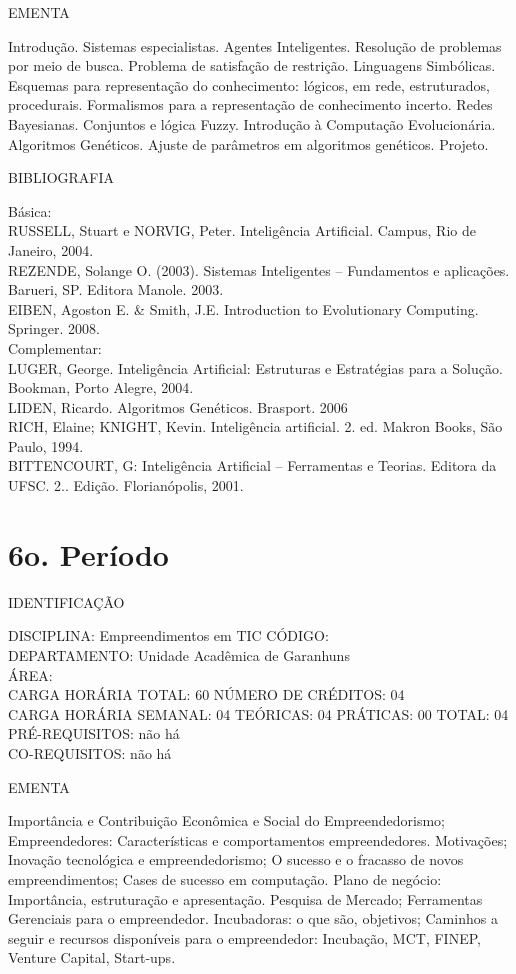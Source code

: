 \documentclass[
	12pt,				%
	openright,			%
  oneside,     %
	a4paper,			%
	chapter=TITLE,		%
	english,			%
	french,				%
	spanish,			%
	brazil				%
	]{abntex2}
\begin{document}
\begin{apendicesenv}
EMENTA 

Introdução. Sistemas especialistas. Agentes Inteligentes. Resolução de
problemas por meio de busca. Problema de satisfação de restrição.
Linguagens Simbólicas. Esquemas para representação do conhecimento:
lógicos, em rede, estruturados, procedurais. Formalismos para a
representação de conhecimento incerto. Redes Bayesianas. Conjuntos e
lógica Fuzzy. Introdução à Computação Evolucionária. Algoritmos
Genéticos. Ajuste de parâmetros em algoritmos genéticos. Projeto.

BIBLIOGRAFIA 

Básica:\\
RUSSELL, Stuart e NORVIG, Peter. Inteligência Artificial. Campus, Rio de
Janeiro, 2004.\\
REZENDE, Solange O. (2003). Sistemas Inteligentes -- Fundamentos e
aplicações. Barueri, SP. Editora Manole. 2003.\\
EIBEN, Agoston E. \& Smith, J.E. Introduction to Evolutionary Computing.
Springer. 2008.\\
Complementar:\\
LUGER, George. Inteligência Artificial: Estruturas e Estratégias para a
Solução. Bookman, Porto Alegre, 2004.\\
LIDEN, Ricardo. Algoritmos Genéticos. Brasport. 2006\\
RICH, Elaine; KNIGHT, Kevin. Inteligência artificial. 2. ed. Makron
Books, São Paulo, 1994.\\
BITTENCOURT, G: Inteligência Artificial -- Ferramentas e Teorias.
Editora da UFSC. 2.. Edição. Florianópolis, 2001.
\newpage 

\section*{6o. Período}

IDENTIFICAÇÃO

DISCIPLINA: Empreendimentos em TIC CÓDIGO:\\ 
DEPARTAMENTO: Unidade Acadêmica de Garanhuns\\
ÁREA:\\
CARGA HORÁRIA TOTAL: 60 NÚMERO DE CRÉDITOS: 04\\
CARGA HORÁRIA SEMANAL: 04 TEÓRICAS: 04 PRÁTICAS: 00 TOTAL: 04\\
PRÉ-REQUISITOS: não há\\
CO-REQUISITOS: não há

EMENTA 

Importância e Contribuição Econômica e Social do Empreendedorismo;
Empreendedores: Características e comportamentos empreendedores.
Motivações; Inovação tecnológica e empreendedorismo; O sucesso e o
fracasso de novos empreendimentos; Cases de sucesso em computação.
Plano de negócio: Importância, estruturação e apresentação. Pesquisa de
Mercado; Ferramentas Gerenciais para o empreendedor. Incubadoras: o que
são, objetivos; Caminhos a seguir e recursos disponíveis para o
empreendedor: Incubação, MCT, FINEP, Venture Capital, Start-ups.


\end{apendicesenv}
\end{document}

